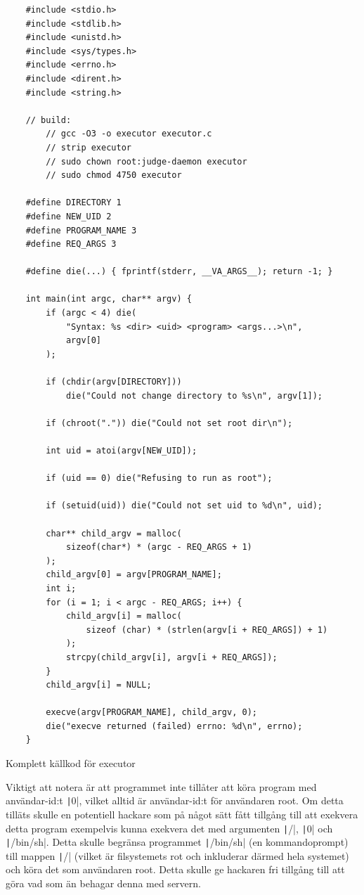 \documentclass{article}
\begin{document}
\begin{verbatim}
	#include <stdio.h>
	#include <stdlib.h>
	#include <unistd.h>
	#include <sys/types.h>
	#include <errno.h>
	#include <dirent.h>
	#include <string.h>

	// build:
		// gcc -O3 -o executor executor.c
		// strip executor
		// sudo chown root:judge-daemon executor
		// sudo chmod 4750 executor

	#define DIRECTORY 1
	#define NEW_UID 2
	#define PROGRAM_NAME 3
	#define REQ_ARGS 3

	#define die(...) { fprintf(stderr, __VA_ARGS__); return -1; }

	int main(int argc, char** argv) {
		if (argc < 4) die(
			"Syntax: %s <dir> <uid> <program> <args...>\n",
			argv[0]
		);

		if (chdir(argv[DIRECTORY]))
			die("Could not change directory to %s\n", argv[1]);

		if (chroot(".")) die("Could not set root dir\n");

		int uid = atoi(argv[NEW_UID]);

		if (uid == 0) die("Refusing to run as root");

		if (setuid(uid)) die("Could not set uid to %d\n", uid);

		char** child_argv = malloc(
			sizeof(char*) * (argc - REQ_ARGS + 1)
		);
		child_argv[0] = argv[PROGRAM_NAME];
		int i;
		for (i = 1; i < argc - REQ_ARGS; i++) {
			child_argv[i] = malloc(
				sizeof (char) * (strlen(argv[i + REQ_ARGS]) + 1)
			);
			strcpy(child_argv[i], argv[i + REQ_ARGS]);
		}
		child_argv[i] = NULL;

		execve(argv[PROGRAM_NAME], child_argv, 0);
		die("execve returned (failed) errno: %d\n", errno);
	}
\end{verbatim}

\begin{listing}[H]
	\caption{Komplett källkod för executor}
\end{listing}

Viktigt att notera är att programmet inte tillåter att köra program med
användar-id:t \texttt|0|, vilket alltid är användar-id:t
för användaren root. Om detta tilläts skulle en potentiell hackare som på något
sätt fått tillgång till att exekvera detta program exempelvis kunna exekvera det
med argumenten \texttt|/|,
\texttt|0| och \texttt|/bin/sh|.
Detta skulle begränsa programmet \texttt|/bin/sh| (en
kommandoprompt) till mappen \texttt|/| (vilket är
filsystemets rot och inkluderar därmed hela systemet) och köra det som
användaren root. Detta skulle ge hackaren fri tillgång till att göra vad som än
behagar denna med servern.
\end{document}
